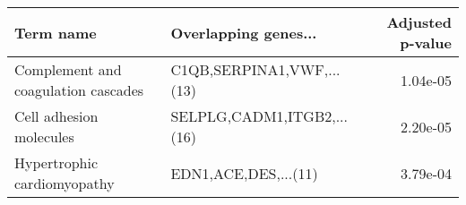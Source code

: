 \begin{tabular}{llr}
\toprule
                          Term name &       Overlapping genes... &  Adjusted p-value \\
\midrule
Complement and coagulation cascades &  C1QB,SERPINA1,VWF,...(13) &          1.04e-05 \\
            Cell adhesion molecules & SELPLG,CADM1,ITGB2,...(16) &          2.20e-05 \\
        Hypertrophic cardiomyopathy &       EDN1,ACE,DES,...(11) &          3.79e-04 \\
\bottomrule
\end{tabular}
